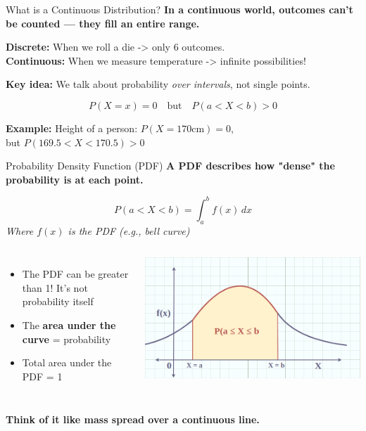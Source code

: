 \documentclass[handout,aspectratio=169]{beamer}
\begin{document}
\begin{frame}{What is a Continuous Distribution?}
	\textbf{In a continuous world, outcomes can't be counted — they fill an entire range.}
	
	\vspace{0.8em}
	\textbf{Discrete:} When we roll a die -> only 6 outcomes.\\
	\textbf{Continuous:} When we measure temperature -> infinite possibilities!
	
	\vspace{1em}
	\textbf{Key idea:} We talk about probability \textit{over intervals}, not single points.
	
	\vspace{1em}
	\[
		P(X = x) = 0 \quad \text{but} \quad P(a < X < b) > 0
	\]
	
	\vspace{0.8em}
	\textbf{Example:} Height of a person: $P(X = 170 \text{cm}) = 0$,\\
	but $P(169.5 < X < 170.5) > 0$
\end{frame}

\begin{frame}{Probability Density Function (PDF)}
	\textbf{A PDF describes how "dense" the probability is at each point.}
	
	\vspace{1em}
	\[
		P(a < X < b) = \int_a^b f(x) \, dx
	\]
	\textit{Where $f(x)$ is the PDF (e.g., bell curve)}
	
	\vspace{1em}
	\begin{columns}
		\begin{itemize}
			\item The PDF can be greater than 1! It’s not probability itself
			\item The \textbf{area under the curve} = probability
			\item Total area under the PDF = 1
		\end{itemize}
		  
		\includegraphics[width=\linewidth]{chapter_figs/01_figs/pdf.png}
	\end{columns}
	  
	
	\vspace{0.5em}
	\textbf{Think of it like mass spread over a continuous line.}
\end{frame}
\end{document}
